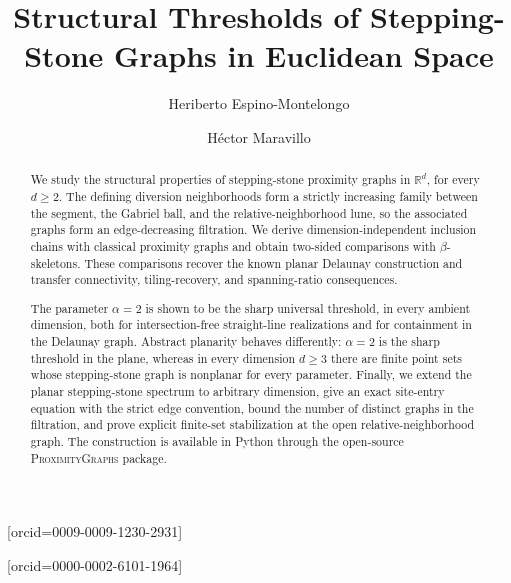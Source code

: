 \documentclass[a4paper,fleqn]{cas-sc}
\theoremstyle{definition}
\theoremstyle{remark}
\newcommand{\R}{\mathds{R}}
\newcommand{\0}{\mathbf{0}}
\begin{document}
\let\WriteBookmarks\relax
\def\floatpagepagefraction{1}
\def\textpagefraction{.001}


\title[mode=title]{Structural Thresholds of Stepping-Stone Graphs
in Euclidean Space}

\author[1]{Heriberto Espino-Montelongo}
    [orcid=0009-0009-1230-2931]
\cormark[1]


\author[2]{H\'ector Maravillo}
    [orcid=0000-0002-6101-1964]





\begin{abstract}
We study the structural properties of stepping-stone proximity graphs in
\(\R^d\), for every \(d\geq2\). The defining diversion neighborhoods form
a strictly increasing family between the segment, the Gabriel ball, and the
relative-neighborhood lune, so the associated graphs form an edge-decreasing
filtration. We derive dimension-independent inclusion chains with classical
proximity graphs and obtain two-sided comparisons with \(\beta\)-skeletons.
These comparisons recover the known planar Delaunay construction and transfer
connectivity, tiling-recovery, and spanning-ratio consequences.

The parameter \(\alpha=2\) is shown to be the sharp universal threshold, in
every ambient dimension, both for intersection-free straight-line
realizations and for containment in the Delaunay graph. Abstract planarity
behaves differently: \(\alpha=2\) is the sharp threshold in the plane,
whereas in every dimension \(d\geq3\) there are finite point sets whose
stepping-stone graph is nonplanar for every parameter. Finally, we extend the
planar stepping-stone spectrum to arbitrary dimension, give an exact
site-entry equation with the strict edge convention, bound the number of
distinct graphs in the filtration, and prove explicit finite-set
stabilization at the open relative-neighborhood graph. The construction is
available in Python through the open-source \textsc{ProximityGraphs} package.
\end{abstract}
\end{document}

